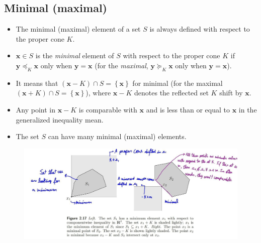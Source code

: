 \documentclass{article}
\begin{document}
\subsection{Minimal (maximal)}
\begin{itemize}
	\item The minimal (maximal) element of a set \(S\) is always defined with respect to the proper cone \(K\).
	\item \(\mathbf{x} \in S\) is the \emph{minimal} element of \(S\) with respect to the proper cone \(K\) if \(\mathbf{y} \preceq_K \mathbf{x}\) only when \(\mathbf{y} = \mathbf{x}\) (for the \emph{maximal}, \(\mathbf{y} \succeq_K \mathbf{x}\) only when \(\mathbf{y} = \mathbf{x}\)).
	\item It means that \((\mathbf{x} - K) \cap S = \left\{ \mathbf{x} \right\}\) for minimal (for the maximal \((\mathbf{x} + K) \cap S = \left\{ \mathbf{x} \right\}\)), where \(\mathbf{x} - K\) denotes the reflected set \(K\) shift by \(\mathbf{x}\).
	\item Any point in \(\mathbf{x} - K\) is comparable with \(\mathbf{x}\) and is less than or equal to \(\mathbf{x}\) in the generalized inequality mean.
	\item The set \(S\) can have many minimal (maximal) elements.
\end{itemize}
\begin{figure}[H]
	\centering
	\includegraphics[scale=.5]{figs/minimum_maximum.jpg}
\end{figure}
\end{document}
